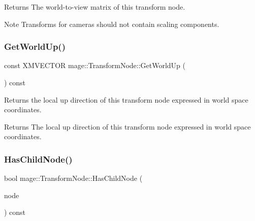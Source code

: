 \begin{DoxyReturn}{Returns}
The world-\/to-\/view matrix of this transform node. 
\end{DoxyReturn}
\begin{DoxyNote}{Note}
Transforms for cameras should not contain scaling components. 
\end{DoxyNote}
\hypertarget{classmage_1_1_transform_node_a05d878f235e94b1814b24a790d738ba6}{}\label{classmage_1_1_transform_node_a05d878f235e94b1814b24a790d738ba6} 
\subsubsection{\texorpdfstring{Get\+World\+Up()}{GetWorldUp()}}
{\footnotesize\ttfamily const X\+M\+V\+E\+C\+T\+OR mage\+::\+Transform\+Node\+::\+Get\+World\+Up (\begin{DoxyParamCaption}{ }\end{DoxyParamCaption}) const}

Returns the local up direction of this transform node expressed in world space coordinates.

\begin{DoxyReturn}{Returns}
The local up direction of this transform node expressed in world space coordinates. 
\end{DoxyReturn}
\hypertarget{classmage_1_1_transform_node_ac83d9d2013494588fb45a469057b18f6}{}\label{classmage_1_1_transform_node_ac83d9d2013494588fb45a469057b18f6} 
\subsubsection{\texorpdfstring{Has\+Child\+Node()}{HasChildNode()}}
{\footnotesize\ttfamily bool mage\+::\+Transform\+Node\+::\+Has\+Child\+Node (\begin{DoxyParamCaption}\item[{\hyperlink{namespacemage_a1e01ae66713838a7a67d30e44c67703e}{Shared\+Ptr}$<$ const \hyperlink{classmage_1_1_node}{Node} $>$}]{node }\end{DoxyParamCaption}) const\hspace{0.3cm}{\ttfamily [private]}}

